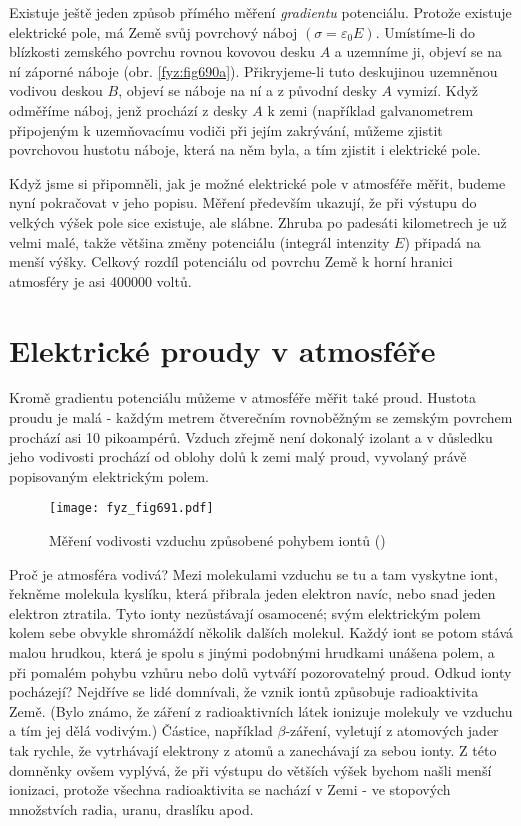     Existuje ještě jeden způsob přímého měření \emph{gradientu} potenciálu. Protože existuje
    elektrické pole, má Země svůj povrchový náboj \((σ=\varepsilon_0E)\). Umístíme-li do blízkosti zemského
    povrchu rovnou kovovou desku \(A\) a uzemníme ji, objeví se na ní záporné náboje (obr.
    \ref{fyz:fig690a}). Přikryjeme-li tuto deskujinou uzemněnou vodivou deskou \(B\), objeví se
    náboje na ní a z původní desky \(A\) vymizí. Když odměříme náboj, jenž prochází z desky \(A\) k
    zemi (například galvanometrem připojeným k uzemňovacímu vodiči při jejím zakrývání, můžeme
    zjistit povrchovou hustotu náboje, která na něm byla, a tím zjistit i elektrické pole.

    Když jsme si připomněli, jak je možné elektrické pole v atmosféře měřit, budeme nyní pokračovat
    v jeho popisu. Měření především ukazují, že při výstupu do velkých výšek pole sice existuje, ale
    slábne. Zhruba po padesáti kilometrech je už velmi malé, takže většina změny potenciálu
    (integrál intenzity \(E\)) připadá na menší výšky. Celkový rozdíl potenciálu od povrchu Země k
    horní hranici atmosféry je asi \num{400000} voltů.

  \section{Elektrické proudy v atmosféře}\label{fyz:IIchapIXsecII}   
    Kromě gradientu potenciálu můžeme v atmosféře měřit také proud. Hustota proudu je malá - každým
    metrem čtverečním rovnoběžným se zemským povrchem prochází asi \num{10} pikoampérů. Vzduch
    zřejmě není dokonalý izolant a v důsledku jeho vodivosti prochází od oblohy dolů k zemi malý
    proud, vyvolaný právě popisovaným elektrickým polem.

    \begin{figure}[ht!] %
      \centering
      \texttt{[image: fyz\_fig691.pdf]}
      \caption{Měření vodivosti vzduchu způsobené pohybem iontů
               (\cite[s.~707]{Feynman02})}
      \label{fyz:fig691}
    \end{figure}

    Proč je atmosféra vodivá? Mezi molekulami vzduchu se tu a tam vyskytne iont, řekněme molekula
    kyslíku, která přibrala jeden elektron navíc, nebo snad jeden elektron ztratila. Tyto ionty
    nezůstávají osamocené; svým elektrickým polem kolem sebe obvykle shromáždí několik dalších
    molekul. Každý iont se potom stává malou hrudkou, která je spolu s jinými podobnými hrudkami
    unášena polem, a při pomalém pohybu vzhůru nebo dolů vytváří pozorovatelný proud. Odkud ionty
    pocházejí? Nejdříve se lidé domnívali, že vznik iontů způsobuje radioaktivita Země. (Bylo známo,
    že záření z radioaktivních látek ionizuje molekuly ve vzduchu a tím jej dělá vodivým.) Částice,
    například \(\beta\)-záření, vyletují z atomových jader tak rychle, že vytrhávají elektrony z
    atomů a zanechávají za sebou ionty. Z této domněnky ovšem vyplývá, že při výstupu do větších
    výšek bychom našli menší ionizaci, protože všechna radioaktivita se nachází v Zemi - ve
    stopových množstvích radia, uranu, draslíku apod.

